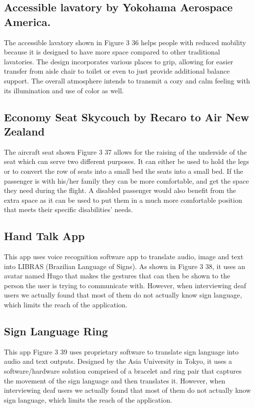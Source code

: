 \documentclass[a4paper, 12pt,conference]{new_cit_thesis}
\begin{document}
\subsection{Accessible lavatory by Yokohama Aerospace America.}
The accessible lavatory shown in Figure 3 36 helps people with reduced mobility because it is designed to have more space compared to other traditional lavatories. The design incorporates various places to grip, allowing for easier transfer from aisle chair to toilet or even to just provide additional balance support. The overall atmosphere intends to transmit a cozy and calm feeling with its illumination and use of color as well.

\subsection{Economy Seat Skycouch by Recaro to Air New Zealand}
The aircraft seat shown Figure 3 37 allows for the raising of the underside of the seat which can serve two different purposes. It can either be used to hold the legs or to convert the row of seats into a small bed the seats into a small bed.   If the passenger is with his/her family they can be more comfortable, and get the space they need during the flight.  A disabled passenger would also benefit from the extra space as it can be used to put them in a much more comfortable position that meets their specific disabilities’ needs.

\subsection{Hand Talk App}
This app uses voice recognition software app to translate audio, image and text into LIBRAS (Brazilian Language of Signs).  As shown in Figure 3 38, it uses an avatar named Hugo that makes the gestures that can then be shown to the person the user is trying to communicate with.  However, when interviewing deaf users we actually found that most of them do not actually know sign language, which limits the reach of the application.

\subsection*{Sign Language Ring}
This app Figure 3 39 uses proprietary software to translate sign language into audio and text outputs. Designed by the Asia University in Tokyo, it uses a software/hardware solution comprised of a bracelet and ring pair that captures the movement of the sign language and then translates it.  However, when interviewing deaf users we actually found that most of them do not actually know sign language, which limits the reach of the application.  
\end{document}
